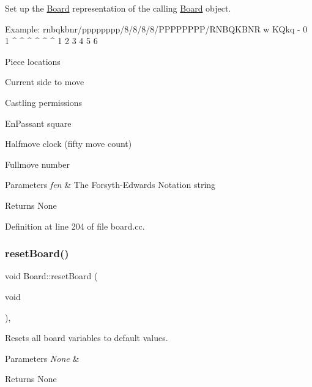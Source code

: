 Set up the \mbox{\hyperlink{classBoard}{Board}} representation of the calling \mbox{\hyperlink{classBoard}{Board}} object. 


\begin{DoxyPre}
Example: rnbqkbnr/pppppppp/8/8/8/8/PPPPPPPP/RNBQKBNR w KQkq - 0 1
                          ^                          ^  ^   ^ ^ ^
                          1                          2  3   4 5 6
     \end{DoxyPre}

\begin{DoxyEnumerate}
\item Piece locations
\item Current side to move
\item Castling permissions
\item En\+Passant square
\item Halfmove clock (fifty move count)
\item Fullmove number 
\begin{DoxyParams}{Parameters}
{\em fen} & The Forsyth-\/\+Edwards Notation string \\
\hline
\end{DoxyParams}
\begin{DoxyReturn}{Returns}
None 
\end{DoxyReturn}

\end{DoxyEnumerate}

Definition at line 204 of file board.\+cc.

\mbox{\label{classBoard_a72d31a84b6f4491b41ad249a047ffa6f}} 
\subsubsection{\texorpdfstring{reset\+Board()}{resetBoard()}}
{\footnotesize\ttfamily void Board\+::reset\+Board (\begin{DoxyParamCaption}\item[{void}]{ }\end{DoxyParamCaption})\hspace{0.3cm}{\ttfamily [private]}, {\ttfamily [noexcept]}}



Resets all board variables to default values. 


\begin{DoxyParams}{Parameters}
{\em None} & \\
\hline
\end{DoxyParams}
\begin{DoxyReturn}{Returns}
None 
\end{DoxyReturn}


